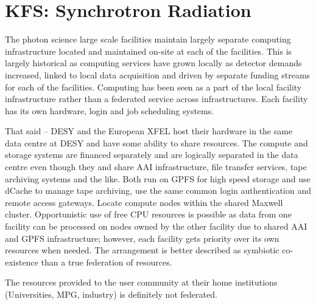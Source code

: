 \section{KFS: Synchrotron Radiation}


The photon science large scale facilities maintain largely separate
computing infrastructure located and maintained on-site at each of the
facilities.   This is largely historical as computing services have
grown locally as detector demands increased, linked to local data
acquisition and driven by separate funding streams for each of the
facilities.  Computing has been seen as a part of the local facility
infrastructure rather than a federated service across infrastructures.
Each facility has its own hardware, login and job scheduling systems. 


That said – DESY and the European XFEL host their hardware in the same
data centre at DESY and have some ability to share resources.   The
compute and storage systems are financed separately and are logically
separated in the data centre even though they and share AAI
infrastructure, file transfer services, tape archiving systems and the
like.  Both run on GPFS for high speed storage and use dCache to manage
tape archiving, use the same common login authentication and remote
access gateways. Locate compute nodes within the shared Maxwell cluster.
Opportunistic use of free CPU resources is possible as data from one
facility can be processed on nodes owned by the other facility due to
shared AAI and GPFS infrastructure; however, each facility gets priority
over its own resources when needed.  The arrangement is better described
as symbiotic co-existence than a true federation of resources. 


The resources provided to the user community at their home institutions
(Universities, MPG, industry) is definitely not federated. 
